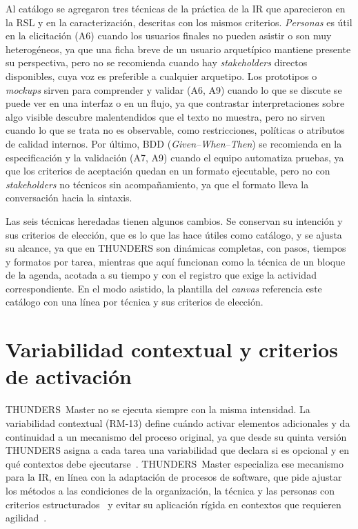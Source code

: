 \documentclass[12pt,letterpaper,oneside]{report}
\begin{document}
Al catálogo se agregaron tres técnicas de la práctica de la IR que aparecieron
en la RSL y en la caracterización, descritas con los mismos criterios.
\textit{Personas} es útil en la elicitación (A6) cuando los usuarios finales no
pueden asistir o son muy heterogéneos, ya que una ficha breve de un usuario
arquetípico mantiene presente su perspectiva, pero no se recomienda cuando hay
\textit{stakeholders} directos disponibles, cuya voz es preferible a cualquier
arquetipo. Los prototipos o \textit{mockups} sirven para comprender y validar
(A6, A9) cuando lo que se discute se puede ver en una interfaz o en un flujo, ya
que contrastar interpretaciones sobre algo visible descubre malentendidos que el
texto no muestra, pero no sirven cuando lo que se trata no es observable, como
restricciones, políticas o atributos de calidad internos. Por último, BDD
(\textit{Given--When--Then}) se recomienda en la especificación y la validación
(A7, A9) cuando el equipo automatiza pruebas, ya que los criterios de aceptación
quedan en un formato ejecutable, pero no con \textit{stakeholders} no técnicos
sin acompañamiento, ya que el formato lleva la conversación hacia la sintaxis.

Las seis técnicas heredadas tienen algunos cambios. Se conservan su intención y
sus criterios de elección, que es lo que las hace útiles como catálogo, y se
ajusta su alcance, ya que en THUNDERS son dinámicas completas, con pasos,
tiempos y formatos por tarea, mientras que aquí funcionan como la técnica de un bloque de la
agenda, acotada a su tiempo y con el registro que exige la actividad
correspondiente. En el modo asistido, la plantilla del \textit{canvas}
referencia este catálogo con una línea por técnica y sus criterios de elección.

\section{Variabilidad contextual y criterios de activación}
\label{sec:variabilidad}
THUNDERS~Master no se ejecuta siempre con la misma intensidad. La variabilidad
contextual (RM-13) define cuándo activar elementos adicionales y da continuidad a
un mecanismo del proceso original, ya que desde su quinta versión THUNDERS
asigna a cada tarea una variabilidad que declara si es opcional y en qué
contextos debe ejecutarse~\cite{agredo2022thesis}. THUNDERS~Master especializa
ese mecanismo para la IR, en línea con la adaptación de procesos de software,
que pide ajustar los métodos a las condiciones de la organización, la técnica y
las personas con criterios estructurados~\cite{kalus2013tailoring} y evitar su
aplicación rígida en contextos que requieren agilidad~\cite{campanelli2015agile}.
\end{document}
